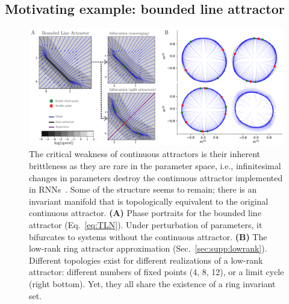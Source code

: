 \documentclass{article} %
\newcounter{ct}
\theoremstyle{definition}
\theoremstyle{remark}
\renewcommand{\cite}{\citep}
\begin{document}
\subsection{Motivating example: bounded line attractor}\label{sec:motivating:line}
\begin{figure}[tbhp]
  \centering
  \includegraphics[width=.9\textwidth]{lara_bifurcations_s}
  \caption{The critical weakness of continuous attractors is their inherent brittleness as they are rare in the parameter space, i.e., infinitesimal changes in parameters destroy the continuous attractor implemented in RNNs~\cite{seung1996,Renart2003}.
  Some of the structure seems to remain; there is an invariant manifold that is topologically equivalent to the original continuous attractor.
    \textbf{(A)} Phase portraits for the bounded line attractor (Eq.~\eqref{eq:TLN}).
    Under perturbation of parameters, it bifurcates to systems without the continuous attractor.
    \textbf{(B)} The low-rank ring attractor approximation (Sec.~\eqref{sec:supp:lowrank}).
    Different topologies exist for different realizations of a low-rank attractor: different numbers of fixed points (4, 8, 12), or a limit cycle (right bottom).
    Yet, they all share the existence of a ring invariant set.
}\label{fig:lara_bifurcations}
\end{figure}
\end{document}
